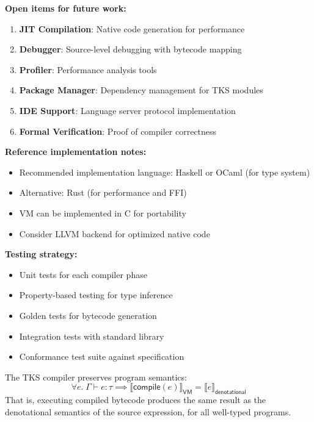 \begin{tcolorbox}[colback=yellow!5!white,colframe=yellow!50!black,title=\textbf{Handoff: TKS v7.3 Compiler Track Complete},breakable]
\textbf{Open items for future work:}
\begin{enumerate}
  \item \textbf{JIT Compilation}: Native code generation for performance
  \item \textbf{Debugger}: Source-level debugging with bytecode mapping
  \item \textbf{Profiler}: Performance analysis tools
  \item \textbf{Package Manager}: Dependency management for TKS modules
  \item \textbf{IDE Support}: Language server protocol implementation
  \item \textbf{Formal Verification}: Proof of compiler correctness
\end{enumerate}

\textbf{Reference implementation notes:}
\begin{itemize}
  \item Recommended implementation language: Haskell or OCaml (for type system)
  \item Alternative: Rust (for performance and FFI)
  \item VM can be implemented in C for portability
  \item Consider LLVM backend for optimized native code
\end{itemize}

\textbf{Testing strategy:}
\begin{itemize}
  \item Unit tests for each compiler phase
  \item Property-based testing for type inference
  \item Golden tests for bytecode generation
  \item Integration tests with standard library
  \item Conformance test suite against specification
\end{itemize}

\end{tcolorbox}

\begin{theorem}
\label{thm:compiler-correctness}
The TKS compiler preserves program semantics:
\[
\forall e.\; \Gamma \vdash e : \tau \implies \llbracket \mathsf{compile}(e) \rrbracket_{\mathsf{VM}} = \llbracket e \rrbracket_{\mathsf{denotational}}
\]
That is, executing compiled bytecode produces the same result as the denotational semantics of the source expression, for all well-typed programs.
\end{theorem}

